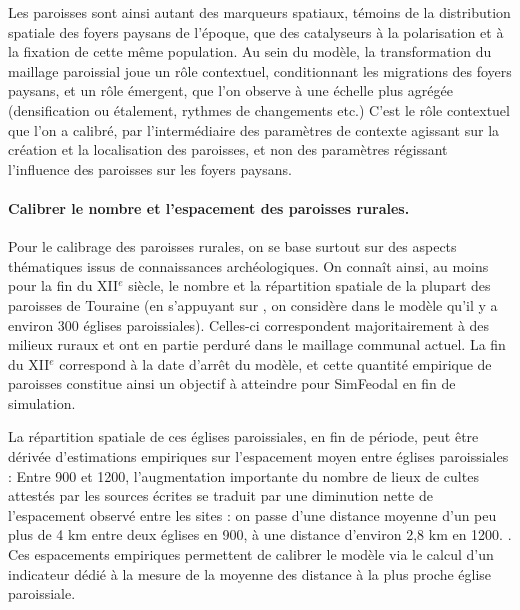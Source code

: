 Les paroisses sont ainsi autant des marqueurs spatiaux, témoins de la distribution spatiale des foyers paysans de l'époque, que des catalyseurs à la polarisation et à la fixation de cette même population.
Au sein du modèle, la transformation du maillage paroissial joue un rôle contextuel, conditionnant les migrations des foyers paysans, et un rôle émergent, que l'on observe à une échelle plus agrégée (densification ou étalement, rythmes de changements etc.)
C'est le rôle contextuel que l'on a calibré, par l'intermédiaire des paramètres de contexte agissant sur la création et la localisation des paroisses, et non des paramètres régissant l'influence des paroisses sur les foyers paysans.

\paragraph{Calibrer le nombre et l'espacement des paroisses \og rurales\fg{}.}

Pour le calibrage des paroisses \og rurales\fg{}, on se base surtout sur des aspects thématiques issus de connaissances archéologiques.
On connaît ainsi, au moins pour la fin du XII$^e$ siècle, le nombre et la répartition spatiale de la plupart des paroisses de Touraine (en s'appuyant sur \textcite[31]{zadora-rio_paroisses_2008}, on considère dans le modèle qu'il y a environ 300 églises paroissiales).
Celles-ci correspondent majoritairement à des milieux ruraux et ont en partie perduré dans le maillage communal actuel.
La fin du XII$^e$ correspond à la date d'arrêt du modèle, et cette quantité empirique de paroisses constitue ainsi un objectif à atteindre pour SimFeodal en fin de simulation.

La répartition spatiale de ces églises paroissiales, en fin de période, peut être dérivée d'estimations empiriques sur l'espacement moyen entre églises paroissiales :
\og Entre 900 et 1200, l'augmentation importante du nombre de lieux de cultes attestés par les sources écrites se traduit par une diminution nette de l'espacement observé entre les sites : on passe d'une distance moyenne d'un peu plus de 4 km entre deux églises en 900, à une distance d'environ 2,8 km en 1200.\fg{} \autocite[261]{chareille_dynamiques_2008}.
Ces espacements empiriques permettent de calibrer le modèle via le calcul d'un indicateur dédié à la mesure de la moyenne des distance à la plus proche église paroissiale.



